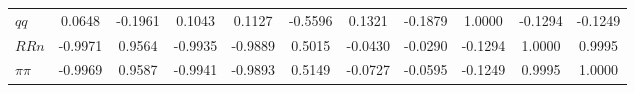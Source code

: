 \begin{center}
\begin{longtable}{lcccccccccc}
$qq         $	 & 	     0.0648	 & 	    -0.1961	 & 	     0.1043	 & 	     0.1127	 & 	    -0.5596	 & 	     0.1321	 & 	    -0.1879	 & 	     1.0000	 & 	    -0.1294	 & 	    -0.1249 \\ 
$RRn        $	 & 	    -0.9971	 & 	     0.9564	 & 	    -0.9935	 & 	    -0.9889	 & 	     0.5015	 & 	    -0.0430	 & 	    -0.0290	 & 	    -0.1294	 & 	     1.0000	 & 	     0.9995 \\ 
$\pi\pi     $	 & 	    -0.9969	 & 	     0.9587	 & 	    -0.9941	 & 	    -0.9893	 & 	     0.5149	 & 	    -0.0727	 & 	    -0.0595	 & 	    -0.1249	 & 	     0.9995	 & 	     1.0000 \\ 
\end{longtable}
 \end{center}
